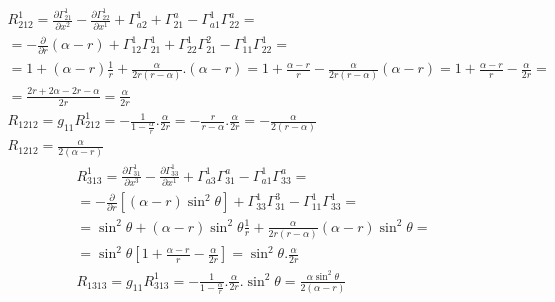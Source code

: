 \documentclass[a4paper,12pt]{article}
\begin{document}
    \begin{equation*}
        \begin{aligned}
            R^1_{212} = \frac{\partial\varGamma^1_{21}}{\partial x^2} - \frac{\partial\varGamma^1_{22}}{\partial x^1} + \varGamma^1_{a2} + \varGamma^a_{21} - \varGamma^1_{a1}\varGamma^a_{22} = \\
            = - \frac{\partial}{\partial r} (\alpha-r) + \varGamma^1_{12}\varGamma^1_{21}+\varGamma^1_{22}\varGamma^2_{21}-\varGamma^1_{11}\varGamma^1_{22} = \\
            =1 + (\alpha - r)\frac{1}{r}+\frac{\alpha}{2r(r-\alpha)}.(\alpha-r) = 1+\frac{\alpha-r}{r} - \frac{\alpha}{2r(r-\alpha)}(\alpha-r)=1+\frac{\alpha-r}{r}-\frac{\alpha}{2r} = \\
            = \frac{2r+2\alpha-2r-\alpha}{2r} = \frac{\alpha}{2r}
            \\
            R_{1212}=g_{11}R^1_{212}=-\frac{1}{1-\frac{\alpha}{r}}.\frac{\alpha}{2r}= - \frac{r}{r-\alpha}.\frac{\alpha}{2r}=-\frac{\alpha}{2(r-\alpha)} \\
            R_{1212}=\frac{\alpha}{2(\alpha-r)}
        \end{aligned}
    \end{equation*}
    \newline
    \begin{equation*}
        \begin{aligned}
            R^1_{313}=\frac{\partial\varGamma^1_{31}}{\partial x^3} - \frac{\partial\varGamma^1_{33}}{\partial x^1}+\varGamma^1_{a3}\varGamma^a_{31}-\varGamma^1_{a1}\varGamma^a_{33} = \\
            = -\frac{\partial}{\partial r} [(\alpha-r)\sin^2\theta] + \varGamma^1_{33}\varGamma^3_{31} - \varGamma^1_{11}\varGamma^1_{33} = \\
            = \sin^2\theta + (\alpha-r)\sin^2\theta\frac{1}{r} + \frac{\alpha}{2r(r-\alpha)}(\alpha-r)\sin^2\theta = \\
            = \sin^2\theta\left[ 1 + \frac{\alpha -r}{r} - \frac{\alpha}{2r} \right] = \sin^2\theta.\frac{\alpha}{2r}
            \\
            R_{1313}=g_{11}R^1_{313} = -\frac{1}{1-\frac{\alpha}{r}}.\frac{\alpha}{2r}.\sin^2\theta = \frac{\alpha\sin^2\theta}{2(\alpha-r)}
        \end{aligned}
    \end{equation*}
    \newline
\end{document}
